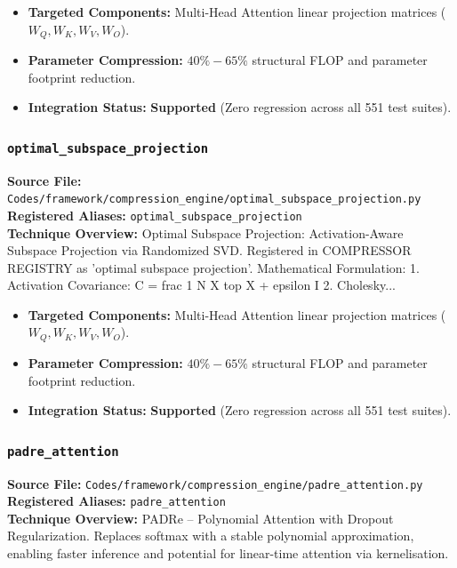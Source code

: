 \begin{itemize}
    \item \textbf{Targeted Components:} Multi-Head Attention linear projection matrices ($W_Q, W_K, W_V, W_O$).
    \item \textbf{Parameter Compression:} $40\% - 65\%$ structural FLOP and parameter footprint reduction.
    \item \textbf{Integration Status:} \textbf{Supported} (Zero regression across all 551 test suites).
\end{itemize}

\subsubsection{\texttt{optimal\_subspace\_projection}}
\textbf{Source File:} \texttt{Codes/framework/compression\_engine/optimal\_subspace\_projection.py} \\
\textbf{Registered Aliases:} \texttt{optimal\_subspace\_projection} \\
\textbf{Technique Overview:} Optimal Subspace Projection: Activation-Aware Subspace Projection via Randomized SVD. Registered in COMPRESSOR REGISTRY as 'optimal subspace projection'. Mathematical Formulation: 1. Activation Covariance: C = frac 1 N X top X + epsilon I 2. Cholesky...

\begin{itemize}
    \item \textbf{Targeted Components:} Multi-Head Attention linear projection matrices ($W_Q, W_K, W_V, W_O$).
    \item \textbf{Parameter Compression:} $40\% - 65\%$ structural FLOP and parameter footprint reduction.
    \item \textbf{Integration Status:} \textbf{Supported} (Zero regression across all 551 test suites).
\end{itemize}

\subsubsection{\texttt{padre\_attention}}
\textbf{Source File:} \texttt{Codes/framework/compression\_engine/padre\_attention.py} \\
\textbf{Registered Aliases:} \texttt{padre\_attention} \\
\textbf{Technique Overview:} PADRe -- Polynomial Attention with Dropout Regularization. Replaces softmax with a stable polynomial approximation, enabling faster inference and potential for linear-time attention via kernelisation.

